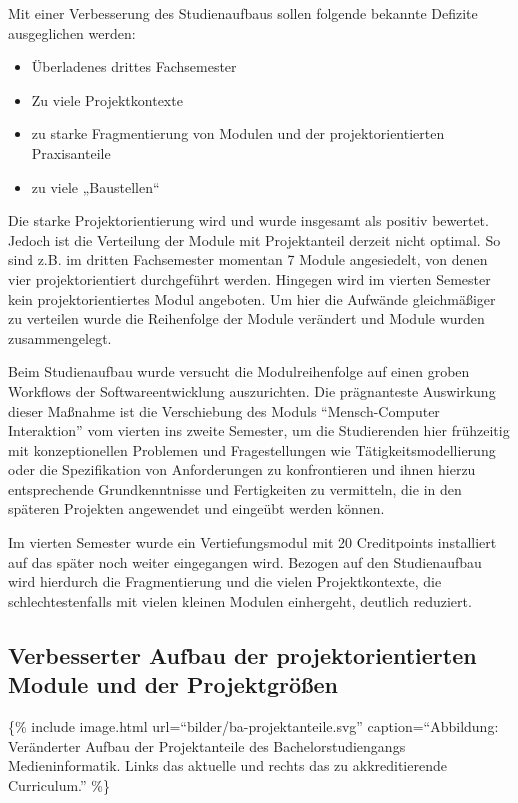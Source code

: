 Mit einer Verbesserung des Studienaufbaus sollen folgende bekannte
Defizite ausgeglichen werden:

\begin{itemize}
\tightlist
\item
  Überladenes drittes Fachsemester
\item
  Zu viele Projektkontexte
\item
  zu starke Fragmentierung von Modulen und der projektorientierten
  Praxisanteile
\item
  zu viele „Baustellen``
\end{itemize}

Die starke Projektorientierung wird und wurde insgesamt als positiv
bewertet. Jedoch ist die Verteilung der Module mit Projektanteil derzeit
nicht optimal. So sind z.B. im dritten Fachsemester momentan 7 Module
angesiedelt, von denen vier projektorientiert durchgeführt werden.
Hingegen wird im vierten Semester kein projektorientiertes Modul
angeboten. Um hier die Aufwände gleichmäßiger zu verteilen wurde die
Reihenfolge der Module verändert und Module wurden zusammengelegt.

Beim Studienaufbau wurde versucht die Modulreihenfolge auf einen groben
Workflows der Softwareentwicklung auszurichten. Die prägnanteste
Auswirkung dieser Maßnahme ist die Verschiebung des Moduls
``Mensch-Computer Interaktion'' vom vierten ins zweite Semester, um die
Studierenden hier frühzeitig mit konzeptionellen Problemen und
Fragestellungen wie Tätigkeitsmodellierung oder die Spezifikation von
Anforderungen zu konfrontieren und ihnen hierzu entsprechende
Grundkenntnisse und Fertigkeiten zu vermitteln, die in den späteren
Projekten angewendet und eingeübt werden können.

Im vierten Semester wurde ein Vertiefungsmodul mit 20 Creditpoints
installiert auf das später noch weiter eingegangen wird. Bezogen auf den
Studienaufbau wird hierdurch die Fragmentierung und die vielen
Projektkontexte, die schlechtestenfalls mit vielen kleinen Modulen
einhergeht, deutlich reduziert.

\subsection{Verbesserter Aufbau der projektorientierten Module und
der
Projektgrößen}\label{verbesserter-aufbau-der-projektorientierten-module-und-der-projektgruxf6uxdfen}

\{\% include image.html url=``bilder/ba-projektanteile.svg''
caption=``Abbildung: Veränderter Aufbau der Projektanteile des
Bachelorstudiengangs Medieninformatik. Links das aktuelle und rechts das
zu akkreditierende Curriculum.'' \%\}

